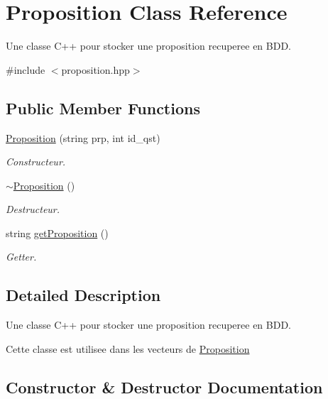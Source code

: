 \hypertarget{classProposition}{}\section{Proposition Class Reference}
\label{classProposition}


Une classe C++ pour stocker une proposition recuperee en B\+DD.  




{\ttfamily \#include $<$proposition.\+hpp$>$}

\subsection*{Public Member Functions}
\begin{DoxyCompactItemize}
\item 
\mbox{\hyperlink{classProposition_a4856cc1dce48fc38822a8f685d0ec29f}{Proposition}} (string prp, int id\+\_\+qst)
\begin{DoxyCompactList}\small\item\em Constructeur. \end{DoxyCompactList}\item 
\mbox{\hyperlink{classProposition_a036537768e8ef96e1a10be0593bd0857}{$\sim$\+Proposition}} ()
\begin{DoxyCompactList}\small\item\em Destructeur. \end{DoxyCompactList}\item 
string \mbox{\hyperlink{classProposition_a17ee28796e7b4193ff8a36ba36abb65a}{get\+Proposition}} ()
\begin{DoxyCompactList}\small\item\em Getter. \end{DoxyCompactList}\end{DoxyCompactItemize}


\subsection{Detailed Description}
Une classe C++ pour stocker une proposition recuperee en B\+DD. 

Cette classe est utilisee dans les vecteurs de \mbox{\hyperlink{classProposition}{Proposition}} 

\subsection{Constructor \& Destructor Documentation}
\mbox{\label{classProposition_a4856cc1dce48fc38822a8f685d0ec29f}} 
